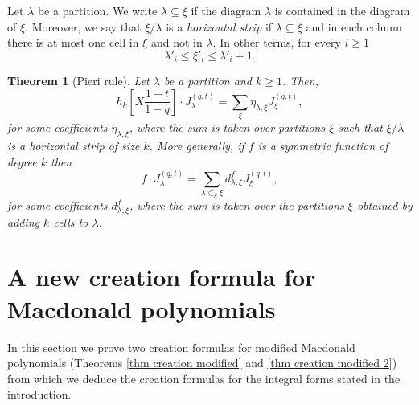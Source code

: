 \documentclass[12pt]{amsart}
\newtheorem{thm}{Theorem}[section]
\theoremstyle{remark}
\newcommand{\J}{{J}^{(q,t)}}
\begin{document}
Let $\lambda$ be a partition. We write $\lambda\subseteq\xi$ if the diagram $\lambda$ is contained in the diagram of $\xi$. Moreover, we say that $\xi/\lambda$ is a \emph{horizontal strip}  if $\lambda\subseteq \xi$ and in each column there is at most one cell in $\xi$ and not in $\lambda$. In other terms, for every $i\geq 1$
$$\lambda'_i\leq \xi'_i\leq \lambda'_i+1.$$

\begin{thm}[Pieri rule]\label{thm Pieri rule}
Let $\lambda$ be a partition and $k\geq 1$. Then, 
$$h_k\left[X\frac{1-t}{1-q}\right]\cdot \J_\lambda=\sum_{\xi}\eta_{\lambda,\xi} \J_\xi,$$
for some coefficients $\eta_{\lambda,\xi}$,  where the sum is taken over partitions $\xi$ such that $\xi/ \lambda$ is a horizontal strip of size $k$.
    More generally, if $f$ is a symmetric function of degree $k$ then 
    $$f\cdot \J_\lambda=\sum_{\lambda\subset_k \xi}d^f_{\lambda,\xi} \J_\xi,$$
    for some coefficients $d^f_{\lambda,\xi}$, where the sum is taken over the partitions $\xi$ obtained by adding $k$ cells to $\lambda$. 
\end{thm}

\section{A new creation formula for Macdonald polynomials}\label{sec creation formula}
In this section we prove two creation formulas for modified Macdonald polynomials (Theorems \ref{thm creation modified} and \ref{thm creation modified 2}) from which we deduce the creation formulas for the integral forms stated in the introduction.
\end{document}
